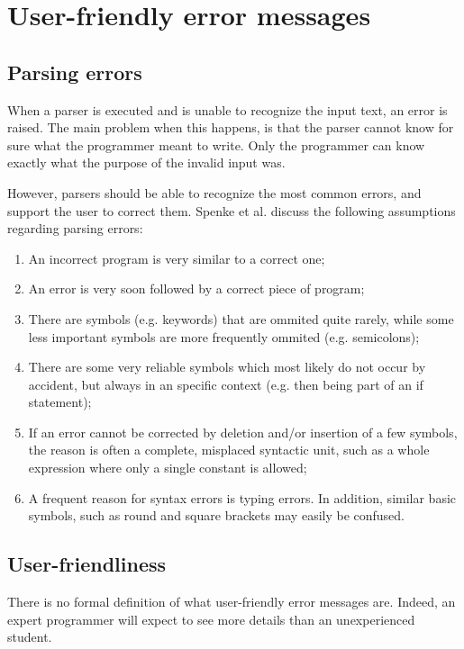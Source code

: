 
\section{User-friendly error messages}
\label{sec:errors}

\subsection{Parsing errors}
When a parser is executed and is unable to recognize the input text, an error is raised.
The main problem when this happens, is that the parser cannot know for sure what the programmer meant to write.
Only the programmer can know exactly what the purpose of the invalid input was.

However, parsers should be able to recognize the most common errors, and support the user to correct them.
Spenke et al. \cite{error-recovery} discuss the following assumptions regarding parsing errors:
\begin{enumerate}
	\item An incorrect program is very similar to a correct one;
	\item An error is very soon followed by a correct piece of program;
	\item There are symbols (e.g. keywords) that are ommited quite rarely, while some less important symbols are more frequently ommited (e.g. semicolons);
	\item There are some very reliable symbols which most likely do not occur by accident, but always in an specific context (e.g. then being part of an if statement);
	\item  If an error cannot be corrected by deletion and/or insertion of a few symbols, the reason is often a complete, misplaced syntactic unit, such as a whole expression where only a single constant is allowed;
	\item A frequent reason for syntax errors is typing errors. In addition, similar basic symbols, such as round and square brackets may easily be confused.
\end{enumerate}

\subsection{User-friendliness}
There is no formal definition of what user-friendly error messages are.
Indeed, an expert programmer will expect to see more details than an unexperienced student.

